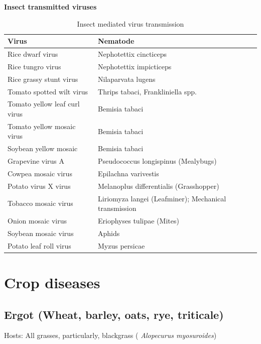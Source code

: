 \documentclass[
  openany]{book}
\begin{document}
\textbf{Insect transmitted viruses}

\begin{table}

\caption{\label{tab:insect-transmissed-viruses}Insect mediated virus transmission}
\centering
\begin{tabular}[t]{ll}
\toprule
Virus & Nematode\\
\midrule
Rice dwarf virus & Nephotettix cincticeps\\
Rice tungro virus & Nephotettix impicticeps\\
Rice grassy stunt virus & Nilaparvata lugens\\
Tomato spotted wilt virus & Thrips tabaci, Frankliniella spp.\\
Tomato yellow leaf curl virus & Bemisia tabaci\\
\addlinespace
Tomato yellow mosaic virus & Bemisia tabaci\\
Soybean yellow mosaic & Bemisia tabaci\\
Grapevine virus A & Pseudococcus longispinus (Mealybugs)\\
Cowpea mosaic virus & Epilachna varivestis\\
Potato virus X virus & Melanoplus differentialis (Grasshopper)\\
\addlinespace
Tobacco mosaic virus & Liriomyza langei (Leafminer); Mechanical transmission\\
Onion mosaic virus & Eriophyses tulipae (Mites)\\
Soybean mosaic virus & Aphids\\
Potato leaf roll virus & Myzus persicae\\
\bottomrule
\end{tabular}
\end{table}

\hypertarget{crop-diseases}{%
\section{Crop diseases}\label{crop-diseases}}

\hypertarget{ergot-wheat-barley-oats-rye-triticale}{%
\subsection{Ergot (Wheat, barley, oats, rye, triticale)}\label{ergot-wheat-barley-oats-rye-triticale}}

Hosts:
All grasses, particularly, blackgrass ( \emph{Alopecurus myosuroides})
\end{document}
